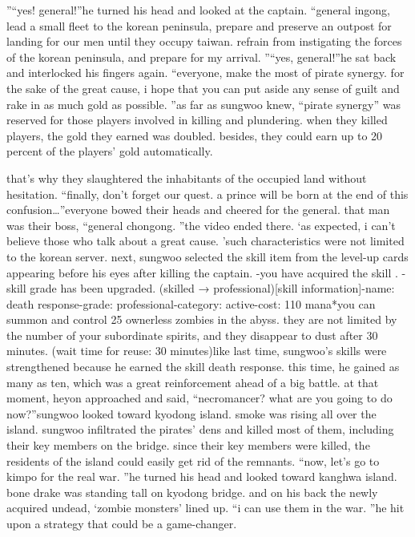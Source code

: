 ”“yes! general!”he turned his head and looked at the captain.
“general ingong, lead a small fleet to the korean peninsula, prepare and preserve an outpost for landing for our men until they occupy taiwan.
 refrain from instigating the forces of the korean peninsula, and prepare for my arrival.
”“yes, general!”he sat back and interlocked his fingers again.
“everyone, make the most of pirate synergy.
 for the sake of the great cause, i hope that you can put aside any sense of guilt and rake in as much gold as possible.
”as far as sungwoo knew, “pirate synergy” was reserved for those players involved in killing and plundering.
 when they killed players, the gold they earned was doubled.
 besides, they could earn up to 20 percent of the players’ gold automatically.


that’s why they slaughtered the inhabitants of the occupied land without hesitation.
“finally, don’t forget our quest.
 a prince will be born at the end of this confusion…”everyone bowed their heads and cheered for the general.
 that man was their boss, “general chongong.
”the video ended there.
‘as expected, i can’t believe those who talk about a great cause.
’such characteristics were not limited to the korean server.
next, sungwoo selected the skill item from the level-up cards appearing before his eyes after killing the captain.
-you have acquired the skill .
-skill grade has been upgraded.
 (skilled → professional)[skill information]-name: death response-grade: professional-category: active-cost: 110 mana*you can summon and control 25 ownerless zombies in the abyss.
 they are not limited by the number of your subordinate spirits, and they disappear to dust after 30 minutes.
 (wait time for reuse: 30 minutes)like last time, sungwoo’s skills were strengthened because he earned the skill death response.
 this time, he gained as many as ten, which was a great reinforcement ahead of a big battle.
at that moment, heyon approached and said, “necromancer? what are you going to do now?”sungwoo looked toward kyodong island.
 smoke was rising all over the island.
sungwoo infiltrated the pirates’ dens and killed most of them, including their key members on the bridge.
 since their key members were killed, the residents of the island could easily get rid of the remnants.
“now, let’s go to kimpo for the real war.
”he turned his head and looked toward kanghwa island.
 bone drake was standing tall on kyodong bridge.
 and on his back the newly acquired undead, ‘zombie monsters’ lined up.
“i can use them in the war.
”he hit upon a strategy that could be a game-changer.


 